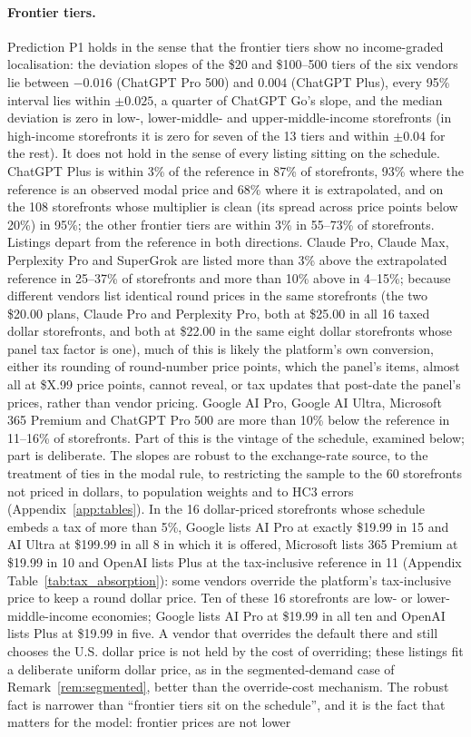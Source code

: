 \documentclass[11pt]{article}
\theoremstyle{definition}
\theoremstyle{remark}
\begin{document}
\paragraph{Frontier tiers.} Prediction P1 holds in the sense that the frontier tiers show no income-graded localisation: the deviation slopes of the \$20 and \$100--500 tiers of the six vendors lie between $-0.016$ (ChatGPT Pro 500) and $0.004$ (ChatGPT Plus), every 95\% interval lies within $\pm0.025$, a quarter of ChatGPT Go's slope, and the median deviation is zero in low-, lower-middle- and upper-middle-income storefronts (in high-income storefronts it is zero for seven of the 13 tiers and within $\pm0.04$ for the rest). It does not hold in the sense of every listing sitting on the schedule. ChatGPT Plus is within 3\% of the reference in 87\% of storefronts, 93\% where the reference is an observed modal price and 68\% where it is extrapolated, and on the 108 storefronts whose multiplier is clean (its spread across price points below 20\%) in 95\%; the other frontier tiers are within 3\% in 55--73\% of storefronts. Listings depart from the reference in both directions. Claude Pro, Claude Max, Perplexity Pro and SuperGrok are listed more than 3\% above the extrapolated reference in 25--37\% of storefronts and more than 10\% above in 4--15\%; because different vendors list identical round prices in the same storefronts (the two \$20.00 plans, Claude Pro and Perplexity Pro, both at \$25.00 in all 16 taxed dollar storefronts, and both at \$22.00 in the same eight dollar storefronts whose panel tax factor is one), much of this is likely the platform's own conversion, either its rounding of round-number price points, which the panel's items, almost all at \$X.99 price points, cannot reveal, or tax updates that post-date the panel's prices, rather than vendor pricing. Google AI Pro, Google AI Ultra, Microsoft 365 Premium and ChatGPT Pro 500 are more than 10\% below the reference in 11--16\% of storefronts. Part of this is the vintage of the schedule, examined below; part is deliberate. The slopes are robust to the exchange-rate source, to the treatment of ties in the modal rule, to restricting the sample to the 60 storefronts not priced in dollars, to population weights and to HC3 errors (Appendix~\ref{app:tables}). In the 16 dollar-priced storefronts whose schedule embeds a tax of more than 5\%, Google lists AI Pro at exactly \$19.99 in 15 and AI Ultra at \$199.99 in all 8 in which it is offered, Microsoft lists 365 Premium at \$19.99 in 10 and OpenAI lists Plus at the tax-inclusive reference in 11 (Appendix Table~\ref{tab:tax_absorption}): some vendors override the platform's tax-inclusive price to keep a round dollar price. Ten of these 16 storefronts are low- or lower-middle-income economies; Google lists AI Pro at \$19.99 in all ten and OpenAI lists Plus at \$19.99 in five. A vendor that overrides the default there and still chooses the U.S. dollar price is not held by the cost of overriding; these listings fit a deliberate uniform dollar price, as in the segmented-demand case of Remark~\ref{rem:segmented}, better than the override-cost mechanism. The robust fact is narrower than ``frontier tiers sit on the schedule'', and it is the fact that matters for the model: frontier prices are not lower 
\end{document}
